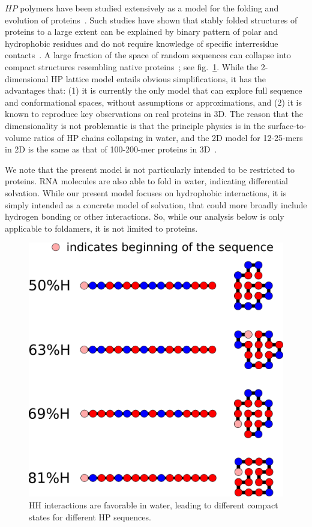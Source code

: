 \documentclass[journal=jacsat,manuscript=article,layout=twocolumn]{achemso}
\begin{document}
 $HP$ polymers have been studied extensively as a model for the folding and evolution of 
 proteins~\cite{lau1989lattice,Chan1991,Miller1995,Yue1995,agarwala1997local}.  Such studies have 
shown that stably folded structures of proteins to a large extent can be explained by binary 
pattern 
of polar and hydrophobic residues and do not require knowledge of specific interresidue 
contacts~\cite{Yue1992,Xiong1995,Fisher2011}. A large fraction of the space of random sequences can 
collapse into compact structures resembling native proteins~\cite{lau1989lattice}; see 
fig.~\ref{fig:hydro-effect}.  While the 2-dimensional HP lattice model entails obvious 
simplifications, it has the advantages that: (1) it is currently the only model that can explore 
full sequence and conformational spaces, without assumptions or approximations, and (2) it is known 
to reproduce key observations on real proteins in 3D.  The reason that the dimensionality is not 
problematic is that the principle physics is in the surface-to-volume ratios of HP chains 
collapsing 
in water, and the 2D model for 12-25-mers in 2D is the same as that of 100-200-mer proteins in 
3D~\cite{Giugliarelli2000}. 
 
  We note that the present model is not particularly intended to be restricted to proteins.  
  RNA molecules are also able to fold in water, indicating differential solvation.  While our 
present model focuses on hydrophobic interactions, it is simply intended as a concrete model of 
solvation, that could more broadly include hydrogen bonding or other interactions.  So, while our 
analysis below is only applicable to foldamers, it is not limited to proteins.
 

\begin{figure}[h!]
  \centering
  \includegraphics[width=\columnwidth]{pictures/tst-seqs.pdf} 
  \caption{\footnotesize{HH interactions are favorable in water, leading to different compact 
states 
for different 
HP sequences.}}
  \label{fig:hydro-effect}
\end{figure}
\end{document}
